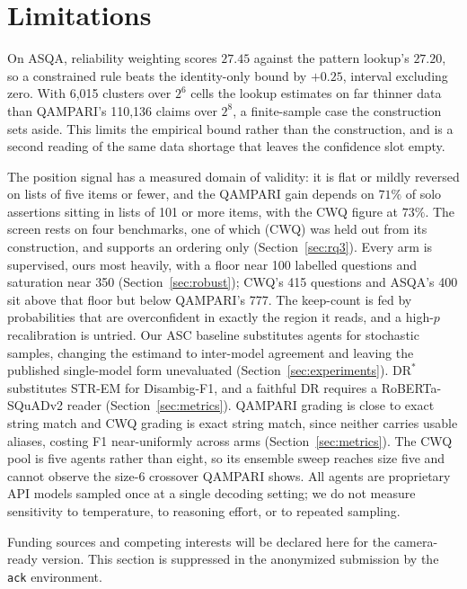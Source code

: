 \documentclass[11pt]{article}
\begin{document}
\section*{Limitations}
\label{sec:limitations}

On ASQA, reliability weighting scores $27.45$ against the pattern lookup's $27.20$, so a constrained rule beats the identity-only bound by $+0.25$, interval excluding zero. With 6,015 clusters over $2^6$ cells the lookup estimates on far thinner data than QAMPARI's 110,136 claims over $2^8$, a finite-sample case the construction sets aside. This limits the empirical bound rather than the construction, and is a second reading of the same data shortage that leaves the confidence slot empty. %

The position signal has a measured domain of validity: it is flat or mildly reversed on lists of five items or fewer, and the QAMPARI gain depends on $71\%$ of solo assertions sitting in lists of 101 or more items, with the CWQ figure at $73\%$. The screen rests on four benchmarks, one of which (CWQ) was held out from its construction, and supports an ordering only (Section~\ref{sec:rq3}). Every arm is supervised, ours most heavily, with a floor near 100 labelled questions and saturation near 350 (Section~\ref{sec:robust}); CWQ's 415 questions and ASQA's 400 sit above that floor but below QAMPARI's 777. The keep-count is fed by probabilities that are overconfident in exactly the region it reads, and a high-$p$ recalibration is untried. Our ASC baseline substitutes agents for stochastic samples, changing the estimand to inter-model agreement and leaving the published single-model form unevaluated (Section~\ref{sec:experiments}). $\mathrm{DR}^*$ substitutes STR-EM for Disambig-F1, and a faithful DR requires a RoBERTa-SQuADv2 reader (Section~\ref{sec:metrics}). QAMPARI grading is close to exact string match and CWQ grading is exact string match, since neither carries usable aliases, costing F1 near-uniformly across arms (Section~\ref{sec:metrics}). The CWQ pool is five agents rather than eight, so its ensemble sweep reaches size five and cannot observe the size-6 crossover QAMPARI shows. All agents are proprietary API models sampled once at a single decoding setting; we do not measure sensitivity to temperature, to reasoning effort, or to repeated sampling.

\begin{ack}
Funding sources and competing interests will be declared here for the camera-ready
version. This section is suppressed in the anonymized submission by the
\texttt{ack} environment.
\end{ack}
\end{document}

